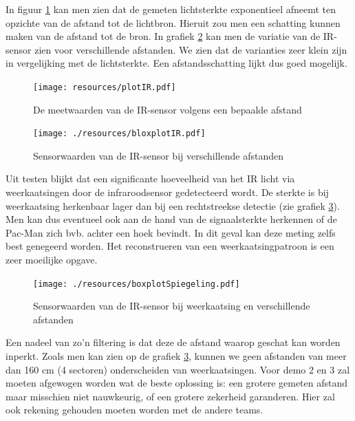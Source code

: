 \documentclass[12pt,a4paper]{report}
\begin{document}
In figuur \ref{fig:plotIR} kan men zien dat de gemeten lichtsterkte exponentieel afneemt ten opzichte van de afstand tot de lichtbron.
Hieruit zou men een schatting kunnen maken van de afstand tot de bron. In grafiek \ref{fig:boxplotIR} kan men de variatie van de IR-sensor zien voor verschillende afstanden. We zien dat de varianties zeer klein zijn in vergelijking met de lichtsterkte. Een afstandsschatting lijkt dus goed mogelijk.

\begin{figure}[htbp]
  \centering
  \texttt{[image: resources/plotIR.pdf]}
  \caption{De meetwaarden van de IR-sensor volgens een bepaalde afstand}
  \label{fig:plotIR}
\end{figure}

\begin{figure}
\begin{center}
 \texttt{[image: ./resources/bloxplotIR.pdf]}
 \caption{Sensorwaarden van de IR-sensor bij verschillende afstanden}
 \label{fig:boxplotIR}
\end{center}
\end{figure}

Uit testen blijkt dat een significante hoeveelheid van het IR licht via weerkaatsingen door de infraroodsensor gedetecteerd wordt.
De sterkte is bij weerkaatsing herkenbaar lager dan bij een rechtstreekse detectie (zie grafiek \ref{fig:boxplotSpiegeling}).  Men kan dus eventueel ook aan de hand van de signaalsterkte herkennen of de Pac-Man zich bvb. achter een hoek bevindt. In dit geval kan deze meting zelfs best genegeerd worden. Het reconstrueren van een weerkaatsingpatroon is een zeer moeilijke opgave.

\begin{figure}
\begin{center}
 \texttt{[image: ./resources/boxplotSpiegeling.pdf]}
 \caption{Sensorwaarden van de IR-sensor bij weerkaatsing en verschillende afstanden}
 \label{fig:boxplotSpiegeling}
\end{center}
\end{figure}

Een nadeel van zo'n filtering is dat deze de afstand waarop geschat kan worden inperkt. Zoals men kan zien op de grafiek \ref{fig:boxplotSpiegeling}, kunnen we geen afstanden van meer dan 160 cm (4 sectoren) onderscheiden van weerkaatsingen. Voor demo 2 en 3 zal moeten afgewogen worden wat de beste oplossing is: een grotere gemeten afstand maar misschien niet nauwkeurig, of een grotere zekerheid garanderen. Hier zal ook rekening gehouden moeten worden met de andere teams. 
\end{document}
